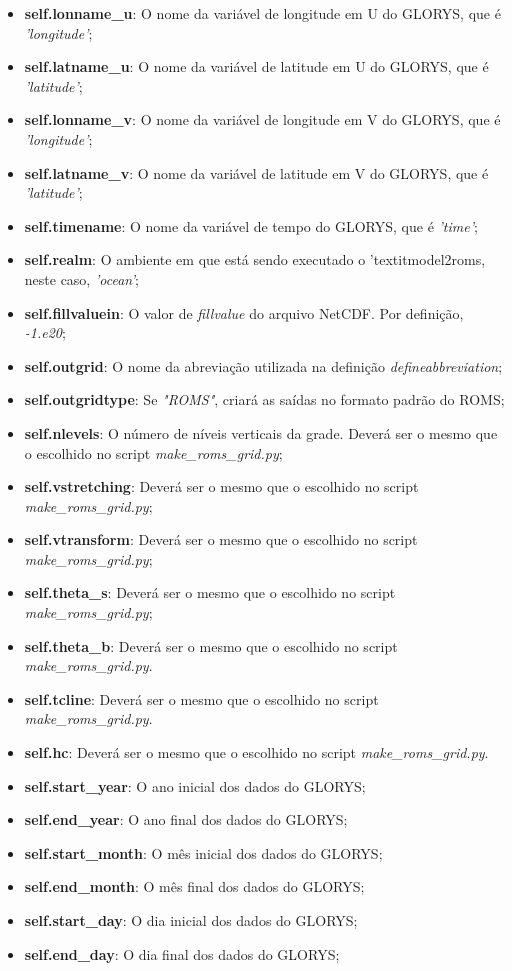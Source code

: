 \begin{itemize}
    \item \textbf{self.lonname\_u}: O nome da variável de longitude em U do GLORYS, que é \textit{'longitude'};
    \item \textbf{self.latname\_u}: O nome da variável de latitude em U do GLORYS, que é \textit{'latitude'};
    \item \textbf{self.lonname\_v}: O nome da variável de longitude em V do GLORYS, que é \textit{'longitude'};
    \item \textbf{self.latname\_v}: O nome da variável de latitude em V do GLORYS, que é \textit{'latitude'};
    \item \textbf{self.timename}: O nome da variável de tempo do GLORYS, que é \textit{'time'};
    \item \textbf{self.realm}: O ambiente em que está sendo executado o 'textit{model2roms}, neste caso, \textit{'ocean'};
    \item \textbf{self.fillvaluein}: O valor de \textit{fillvalue} do arquivo NetCDF. Por definição, \textit{-1.e20};
    \item \textbf{self.outgrid}: O nome da abreviação utilizada na definição \textit{defineabbreviation};
    \item \textbf{self.outgridtype}: Se \textit{"ROMS"}, criará as saídas no formato padrão do ROMS;
    \item \textbf{self.nlevels}: O número de níveis verticais da grade. Deverá ser o mesmo que o escolhido no script \textit{make\_roms\_grid.py};
    \item \textbf{self.vstretching}: Deverá ser o mesmo que o escolhido no script \textit{make\_roms\_grid.py};
    \item \textbf{self.vtransform}: Deverá ser o mesmo que o escolhido no script \textit{make\_roms\_grid.py};
    \item \textbf{self.theta\_s}: Deverá ser o mesmo que o escolhido no script \textit{make\_roms\_grid.py};
    \item \textbf{self.theta\_b}: Deverá ser o mesmo que o escolhido no script \textit{make\_roms\_grid.py}.
    \item \textbf{self.tcline}: Deverá ser o mesmo que o escolhido no script \textit{make\_roms\_grid.py}.   
    \item \textbf{self.hc}: Deverá ser o mesmo que o escolhido no script \textit{make\_roms\_grid.py}.
    \item \textbf{self.start\_year}: O ano inicial dos dados do GLORYS;
    \item \textbf{self.end\_year}: O ano final dos dados do GLORYS;  
    \item \textbf{self.start\_month}: O mês inicial dos dados do GLORYS;  
    \item \textbf{self.end\_month}: O mês final dos dados do GLORYS;  
    \item \textbf{self.start\_day}: O dia inicial dos dados do GLORYS;  
    \item \textbf{self.end\_day}: O dia final dos dados do GLORYS;    
\end{itemize}
\bigskip

